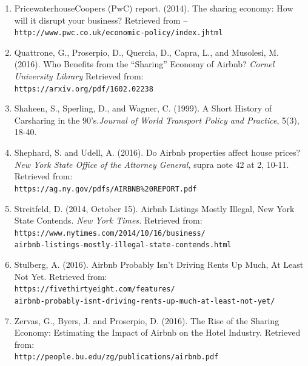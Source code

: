 \documentclass[10pt,letterpaper,onecolumn]{article}
\begin{document}
\begin{enumerate}
\item PricewaterhouseCoopers (PwC) report. (2014). The sharing economy: How will it disrupt your business? Retrieved from --
\\\texttt{http://www.pwc.co.uk/economic-policy/index.jhtml}

\item Quattrone, G., Proserpio, D., Quercia, D., Capra, L., and Musolesi, M. (2016). Who Benefits from the ``Sharing'' Economy of Airbnb? \emph{Cornel University Library} Retrieved from: 
\\\texttt{https://arxiv.org/pdf/1602.02238}

\item Shaheen, S., Sperling, D., and Wagner, C. (1999). A Short History of Carsharing in the 90's.\emph{Journal of World Transport Policy and Practice}, 5(3), 18-40.

\item Shephard, S. and Udell, A. (2016). Do Airbnb properties affect house prices? \emph{New York State Office of the Attorney General,} supra note 42 at
  2, 10-11. Retrieved from: 
\\\texttt{https://ag.ny.gov/pdfs/AIRBNB\%20REPORT.pdf}

\item Streitfeld, D. (2014, October 15). Airbnb Listings Mostly Illegal\emph{,} New York State Contends. \emph{New York Times.}
Retrieved from:
\\\texttt{https://www.nytimes.com/2014/10/16/business/}
\\\hspace*{1cm}\texttt{airbnb-listings-mostly-illegal-state-contends.html}

\item Stulberg, A. (2016). Airbnb Probably Isn't Driving Rents Up Much, At Least Not Yet. Retrieved from:
\\\texttt{https://fivethirtyeight.com/features/}
\\\hspace*{1cm}\texttt{airbnb-probably-isnt-driving-rents-up-much-at-least-not-yet/}

\item Zervas, G., Byers, J. and Proserpio, D. (2016). The Rise of the Sharing Economy: Estimating the Impact of Airbnb on the Hotel Industry.
Retrieved from: 
\\\texttt{http://people.bu.edu/zg/publications/airbnb.pdf}
\end{enumerate}
\end{document}
